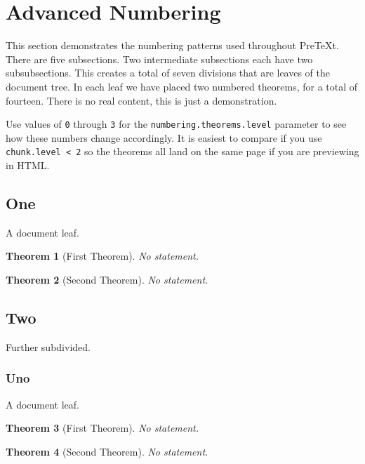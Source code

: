 \documentclass[10pt,]{article}
\theoremstyle{plain}
\newtheorem{theorem}{Theorem}[section]
\theoremstyle{definition}
\theoremstyle{definition}
\theoremstyle{definition}
\theoremstyle{definition}
\theoremstyle{definition}
\theoremstyle{definition}
\numberwithin{equation}{section}
\begin{document}
\section[{Advanced Numbering}]{Advanced Numbering}\label{advanced-numbering}
\hypertarget{p-757}{}%
This section demonstrates the numbering patterns used throughout PreTeXt.  There are five subsections.  Two intermediate subsections each have two subsubsections.  This creates a total of seven divisions that are leaves of the document tree.  In each leaf we have placed two numbered theorems, for a total of fourteen.  There is no real content, this is just a demonstration.%
\par
\hypertarget{p-758}{}%
Use values of \lstinline?0? through \lstinline?3? for the \lstinline?numbering.theorems.level? parameter to see how these numbers change accordingly.  It is easiest to compare if you use \lstinline?chunk.level < 2? so the theorems all land on the same page if you are previewing in HTML.%
\typeout{************************************************}
\typeout{************************************************}
\subsection[{One}]{One}\label{subsection-52}
\hypertarget{p-759}{}%
A document leaf.%
\begin{theorem}[{First Theorem}]\label{theorem-number-01}
\hypertarget{p-760}{}%
No statement.%
\end{theorem}
\begin{theorem}[{Second Theorem}]\label{theorem-number-02}
\hypertarget{p-761}{}%
No statement.%
\end{theorem}
\typeout{************************************************}
\typeout{************************************************}
\subsection[{Two}]{Two}\label{subsection-53}
\hypertarget{p-762}{}%
Further subdivided.%
\typeout{************************************************}
\typeout{************************************************}
\subsubsection[{Uno}]{Uno}\label{subsubsection-6}
\hypertarget{p-763}{}%
A document leaf.%
\begin{theorem}[{First Theorem}]\label{theorem-number-03}
\hypertarget{p-764}{}%
No statement.%
\end{theorem}
\begin{theorem}[{Second Theorem}]\label{theorem-number-04}
\hypertarget{p-765}{}%
No statement.%
\end{theorem}
\typeout{************************************************}
\typeout{************************************************}
\end{document}
